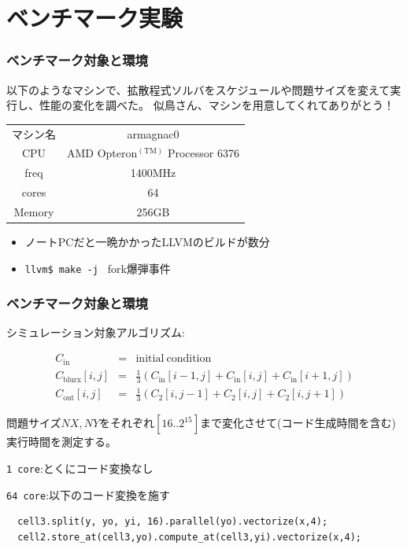\documentclass[dvipdfmx,cjk]{beamer}
\begin{document}
\section{ベンチマーク実験}
\begin{frame}\frametitle{ベンチマーク対象と環境}

以下のようなマシンで、拡散程式ソルバをスケジュールや問題サイズを変えて実行し、性能の変化を調べた。
似鳥さん、マシンを用意してくれてありがとう！

\begin{center}
  \begin{tabular}{|c|c|}
    \hline
    マシン名 & armagnac0\\
    CPU & AMD Opteron${}^\mathrm{(TM)}$ Processor 6376 \\
    freq & 1400MHz \\
    cores & 64 \\
    Memory & 256GB \\
    \hline
  \end{tabular}
\end{center}

\begin{itemize}
\item ノートPCだと一晩かかったLLVMのビルドが数分
\item {\tt llvm\$ make -j } fork爆弾事件
\end{itemize}
\end{frame}


\begin{frame}[fragile]\frametitle{ベンチマーク対象と環境}

シミュレーション対象アルゴリズム:

\begingroup \footnotesize
\begin{eqnarray*}
C_\mathrm{in} &=& \mathrm{initial~condition} \\
C_\mathrm{blurx} [i,j] &=& \frac{1}{3}\left(C_\mathrm{in}[i-1,j] + C_\mathrm{in}[i,j] + C_\mathrm{in}[i+1,j]\right) \\
C_\mathrm{out} [i,j] &=& \frac{1}{3}\left(C_\mathrm{2}[i,j-1] + C_\mathrm{2}[i,j] + C_\mathrm{2}[i,j+1]\right)
\end{eqnarray*}
\endgroup

問題サイズ$NX,NY$をそれぞれ$[16 .. 2^{15}]$まで変化させて(コード生成時間を含む)実行時間を測定する。

{\tt 1 core}:とくにコード変換なし

{\tt 64 core}:以下のコード変換を施す

\begingroup
    \fontsize{8pt}{9pt}\selectfont
\begin{verbatim}
  cell3.split(y, yo, yi, 16).parallel(yo).vectorize(x,4);
  cell2.store_at(cell3,yo).compute_at(cell3,yi).vectorize(x,4);
\end{verbatim}
\endgroup


\end{frame}
\end{document}
